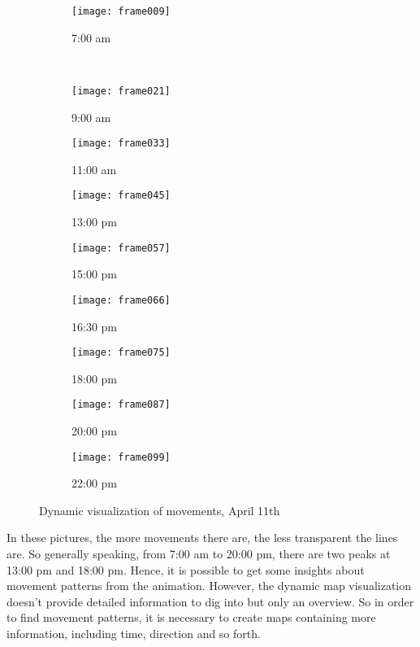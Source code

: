 \begin{figure}[H]
\captionsetup[subfigure]{justification=centering}
    \centering
    \begin{subfigure}[t]{0.3\textwidth}
        \centering
        \texttt{[image: frame009]}
        \caption{7:00 am}
    \end{subfigure}%
    ~ 
    \begin{subfigure}[t]{0.3\textwidth}
        \centering
        \texttt{[image: frame021]}
        \caption{9:00 am}
    \end{subfigure}
    \begin{subfigure}[t]{0.3\textwidth}
        \centering
        \texttt{[image: frame033]}
        \caption{11:00 am}
    \end{subfigure}
    \begin{subfigure}[t]{0.3\textwidth}
        \centering
        \texttt{[image: frame045]}
        \caption{13:00 pm}
    \end{subfigure}
    \begin{subfigure}[t]{0.3\textwidth}
        \centering
        \texttt{[image: frame057]}
        \caption{15:00 pm}
    \end{subfigure}
    \begin{subfigure}[t]{0.3\textwidth}
        \centering
        \texttt{[image: frame066]}
        \caption{16:30 pm}
    \end{subfigure}
    \begin{subfigure}[t]{0.3\textwidth}
        \centering
        \texttt{[image: frame075]}
        \caption{18:00 pm}
    \end{subfigure}
    \begin{subfigure}[t]{0.3\textwidth}
        \centering
        \texttt{[image: frame087]}
        \caption{20:00 pm}
    \end{subfigure}
    \begin{subfigure}[t]{0.3\textwidth}
        \centering
        \texttt{[image: frame099]}
        \caption{22:00 pm}
    \end{subfigure}

    \captionsetup{justification=centering}
    \caption{Dynamic visualization of movements, April 11th}
    \label{autovisualization}
\end{figure}

In these pictures, the more movements there are, the less transparent the lines are. So generally speaking, from 7:00 am to 20:00 pm, there are two peaks at 13:00 pm and 18:00 pm. Hence, it is possible to get some insights about movement patterns from the animation. However, the dynamic map visualization doesn't provide detailed information to dig into but only an overview. So in order to find movement patterns, it is necessary to create maps containing more information, including time, direction and so forth. 

